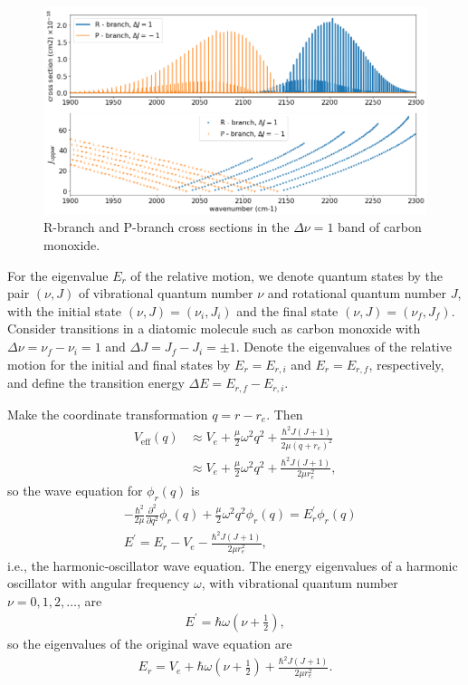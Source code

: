 \begin{figure}
    \centering
    \includegraphics[width=\linewidth]{fig/branch_13_0.png}
    \caption{R-branch and P-branch cross sections in the $\Delta \nu=1$ band of carbon monoxide.}
    \label{fig:rpbranchco}
\end{figure}

For the eigenvalue $E_r$ of the relative motion, we denote quantum states by the pair $(\nu, J)$ of vibrational quantum number $\nu$ and rotational quantum number $J$, with the initial state $(\nu,J) = (\nu_i, J_i)$ and the final state $(\nu,J) = (\nu_f, J_f)$. Consider transitions in a diatomic molecule such as carbon monoxide with $\Delta \nu = \nu_f - \nu_i = 1$ and $\Delta J = J_f - J_i = \pm 1$. Denote the eigenvalues of the relative motion for the initial and final states by $E_r = E_{r,i}$ and $E_r = E_{r,f}$, respectively, and define the transition energy $\Delta E = E_{r,f} - E_{r,i}$.

Make the coordinate transformation $q=r - r_e$. Then
\begin{align}
\label{eq:vpotent}
V_\mathrm{eff} (q) &\approx V_e + \frac{\mu}{2} \omega^2 q^2 + \frac{\hbar^2 J(J+1)}{2 \mu (q + r_e)^2} \\
&\approx V_e + \frac{\mu}{2} \omega^2 q^2 + \frac{\hbar^2 J(J+1)}{2 \mu  r_e^2},
\end{align}
so the wave equation for $\phi_r(q)$ is
\begin{align}
&- \frac{\hbar^2}{2 \mu} \frac{\partial^2}{\partial q^2} \phi_r(q) + \frac{\mu}{2} \omega^2 q^2 \phi_r(q) = E^\prime_r \phi_r(q) \\
&E^\prime = E_r - V_e - \frac{\hbar^2 J(J+1)}{2 \mu r_e^2},
\end{align}
i.e., the harmonic-oscillator wave equation. The energy eigenvalues of a harmonic oscillator with angular frequency $\omega$, with vibrational quantum number $\nu=0,1,2,\dots$, are
\begin{align}
E^\prime = \hbar \omega \left( \nu + \frac{1}{2} \right),
\end{align}
so the eigenvalues of the original wave equation are
\begin{align}
E_r = V_e + \hbar \omega \left( \nu + \frac{1}{2} \right) + \frac{\hbar^2 J(J+1)}{2 \mu r_e^2}.
\end{align}

